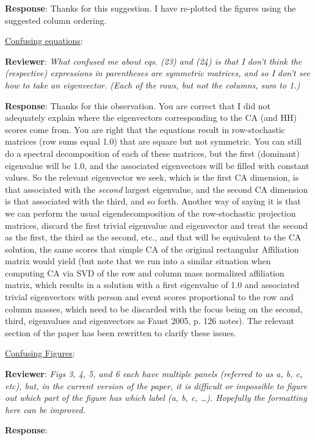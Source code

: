 \documentclass{article}
\begin{document}
\textbf{Response}: Thanks for this suggestion. I have re-plotted the figures using the suggested column ordering. 

\underline{Confusing equations}:

\textbf{Reviewer}: \textit{What confused me about eqs. (23) and (24) is that I don't think the (respective) expressions in parentheses are symmetric matrices, and so I don't see how to take an eigenvector. (Each of the rows, but not the columns, sum to 1.)}

\textbf{Response}: Thanks for this observation. You are correct that I did not adequately explain where the eigenvectors corresponding to the CA (and HH) scores come from. You are right that the equations result in row-stochastic matrices (row sums equal 1.0) that are square but not symmetric. You can still do a spectral decomposition of each of these matrices, but the first (dominant) eigenvalue will be 1.0, and the associated eigenvectors will be filled with constant values. So the relevant eigenvector we seek, which is the first CA dimension, is that associated with the \textit{second} largest eigenvalue, and the second CA dimension is that associated with the third, and so forth. Another way of saying it is that we can perform the usual eigendecomposition of the row-stochastic projection matrices, discard the first trivial eigenvalue and eigenvector and treat the second as the first, the third as the second, etc., and that will be equivalent to the CA solution, the same scores that simple CA of the original rectangular Affiliation matrix would yield (but note that we run into a similar situation when computing CA via SVD of the row and column mass normalized affiliation matrix, which results in a solution with a first eigenvalue of 1.0 and associated trivial eigenvectors with person and event scores proportional to the row and column masses, which need to be discarded with the focus being on the second, third, eigenvalues and eigenvectors as Faust 2005, p. 126 notes). The relevant section of the paper has been rewritten to clarify these issues. 

\underline{Confusing Figures}:

\textbf{Reviewer}: \textit{Figs 3, 4, 5, and 6 each have multiple panels (referred to as a, b, c, etc), but, in the current version of the paper, it is difficult or impossible to figure out which part of the figure has which label (a, b, c, …). Hopefully the formatting here can be improved.}

\textbf{Response}: 
\end{document}
